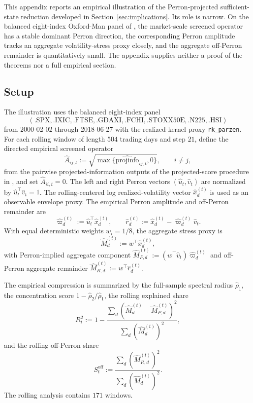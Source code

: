 \documentclass[11pt,a4paper]{amsart}
\theoremstyle{plain}
\theoremstyle{definition}
\theoremstyle{remark}
\begin{document}
This appendix reports an empirical illustration of the Perron-projected sufficient-state reduction
developed in Section~\ref{sec:implications}.  Its role is narrow.  On the balanced eight-index
Oxford-Man panel of \cite{oxfordman2009library}, the market-scale screened operator has a stable
dominant Perron direction, the corresponding Perron amplitude tracks an aggregate volatility-stress
proxy closely, and the aggregate off-Perron remainder is quantitatively small.  The appendix supplies
neither a proof of the theorems nor a full empirical section.

\subsection*{Setup}

The illustration uses the balanced eight-index panel
\[
        (\text{.SPX},\text{.IXIC},\text{.FTSE},\text{.GDAXI},\text{.FCHI},\text{.STOXX50E},\text{.N225},\text{.HSI})
\]
from 2000-02-02 through 2018-06-27 with the realized-kernel proxy \texttt{rk\_parzen}.  For each rolling
window of length \(504\) trading days and step \(21\), define the directed empirical screened
operator
\[
        \widehat A_{ij,t}
        :=
        \sqrt{\max\{\widehat{\mathrm{projinfo}}_{ij,t},0\}},
        \qquad
        i\neq j,
\]
from the pairwise projected-information outputs of the projected-score procedure in
\cite{vidal2026econometric}, and set \(\widehat A_{ii,t}=0\).  The left and right Perron vectors
\((\widehat u_t,\widehat v_t)\) are normalized by \(\widehat u_t^\top \widehat v_t=1\).  The
rolling-centered log realized-volatility vector \(\widehat x_d^{(t)}\) is used as an observable
envelope proxy.  The empirical Perron amplitude and off-Perron remainder are
\[
        \widehat\varpi_d^{(t)}:=\widehat u_t^\top \widehat x_d^{(t)},
        \qquad
        \widehat r_d^{(t)}:=\widehat x_d^{(t)}-\widehat\varpi_d^{(t)}\widehat v_t.
\]
With equal deterministic weights \(w_i=1/8\), the aggregate stress proxy is
\[
        \widehat M_d^{(t)}:=w^\top \widehat x_d^{(t)},
\]
with Perron-implied aggregate component \(\widehat M_{P,d}^{(t)}:=(w^\top \widehat v_t)\widehat
\varpi_d^{(t)}\) and off-Perron aggregate remainder \(\widehat M_{R,d}^{(t)}:=w^\top \widehat
r_d^{(t)}\).

The empirical compression is summarized by the full-sample spectral radius \(\widehat\rho_1\), the
concentration score \(1-\widehat\rho_2/\widehat\rho_1\), the rolling explained share
\[
        R_t^2
        :=
        1-\frac{\sum_d(\widehat M_d^{(t)}-\widehat M_{P,d}^{(t)})^2}
        {\sum_d(\widehat M_d^{(t)})^2},
\]
and the rolling off-Perron share
\[
        S_t^{\mathrm{off}}
        :=
        \frac{\sum_d(\widehat M_{R,d}^{(t)})^2}
        {\sum_d(\widehat M_d^{(t)})^2}.
\]
The rolling analysis contains \(171\) windows.
\end{document}
